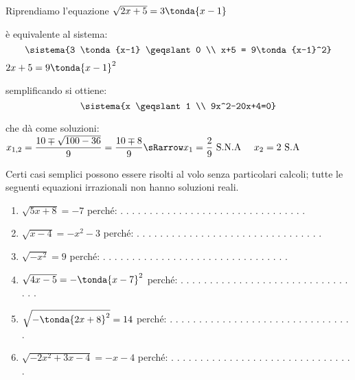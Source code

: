 \begin{esempio}
Riprendiamo l'equazione \(\sqrt{2x+5} = 3 \tonda{x-1}\)
 
 è equivalente al sistema: 
\[\sistema{3 \tonda{x-1} \geqslant 0 \\
           x+5 = 9\tonda{x-1}^2}
\]
\(2x+5 = 9\tonda{x-1}^2\)
 
 semplificando si ottiene: 
\[\sistema{x \geqslant 1 \\
           9x^2-20x+4=0}
\]

 che dà come soluzioni:
 \(x_{1,2} = \dfrac{10 \mp \sqrt{100-36}}{9} = \dfrac{10 \mp 8}{9} \sRarrow 
 x_1 = \dfrac{2}{9} \text{ S.N.A } \quad  x_2 = 2 \text{ S.A}\)
 
\end{esempio}

Certi casi semplici possono essere risolti al volo senza particolari calcoli;
tutte le seguenti equazioni irrazionali non hanno soluzioni reali.

\begin{enumerate}
 \item \(\sqrt{5x +8} = -7\) 
 \hfill perché: . . . . . . . . . . . . . . . . . . . . . . . . . . . . . . . .
 \item \(\sqrt{x-4} = -x^2-3\) 
 \hfill perché: . . . . . . . . . . . . . . . . . . . . . . . . . . . . . . . .
 \item \(\sqrt{-x^2} = 9\)  
 \hfill perché: . . . . . . . . . . . . . . . . . . . . . . . . . . . . . . . .
 \item \(\sqrt{4x-5} = -\tonda{x-7}^2\) 
 \hfill perché: . . . . . . . . . . . . . . . . . . . . . . . . . . . . . . . .
 \item \(\sqrt{-\tonda{2x+8}^2} = 14\) 
 \hfill perché: . . . . . . . . . . . . . . . . . . . . . . . . . . . . . . . .
 \item \(\sqrt{-2x^2 + 3x -4} = -x-4\) 
 \hfill perché: . . . . . . . . . . . . . . . . . . . . . . . . . . . . . . . .
\end{enumerate}





            



















